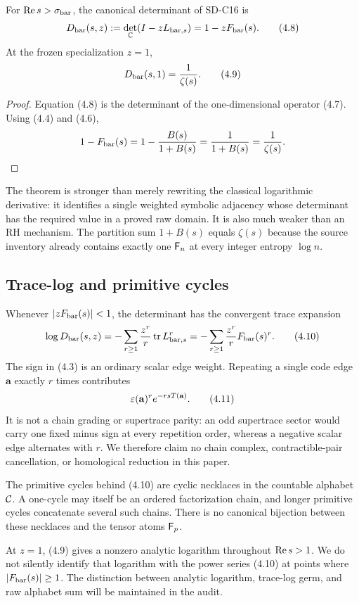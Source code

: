 \begin{theorem}
\label{thm:determinant}
For $\operatorname{Re} s>\sigma_{\rm bar}$, the canonical determinant of SD-C16 is
\[
  D_{\rm bar}(s,z)
  :=\det_{\mathbb C}(I-zL_{\mathrm{bar},s})
  =1-zF_{\rm bar}(s).
  \tag{4.8}
\]
At the frozen specialization $z=1$,
\[
  D_{\rm bar}(s,1)=\frac{1}{\zeta(s)}.
  \tag{4.9}
\]
\end{theorem}

\begin{proof}
Equation (4.8) is the determinant of the one-dimensional operator (4.7).
Using (4.4) and (4.6),
\[
  1-F_{\rm bar}(s)=1-\frac{B(s)}{1+B(s)}
             =\frac1{1+B(s)}=\frac1{\zeta(s)}.
\]
\end{proof}

The theorem is stronger than merely rewriting the classical logarithmic
derivative: it identifies a single weighted symbolic adjacency whose
determinant has the required value in a proved raw domain.  It is also much
weaker than an RH mechanism.  The partition sum $1+B(s)$ equals $\zeta(s)$
because the source inventory already contains exactly one $\mathsf F_n$ at every
integer entropy $\log n$.

\subsection{Trace-log and primitive cycles}

Whenever $|zF_{\rm bar}(s)|<1$, the determinant has the convergent trace expansion
\[
  \log D_{\rm bar}(s,z)
  =-\sum_{r\ge1}\frac{z^r}{r}\operatorname{tr} L_{\mathrm{bar},s}^r
  =-\sum_{r\ge1}\frac{z^r}{r}F_{\rm bar}(s)^r.
  \tag{4.10}
\]
The sign in (4.3) is an ordinary scalar edge weight.  Repeating a single code
edge $\mathbf a$ exactly $r$ times contributes
\[
  \varepsilon(\mathbf a)^r e^{-rsT(\mathbf a)}.
  \tag{4.11}
\]
It is not a chain grading or supertrace parity: an odd supertrace sector would
carry one fixed minus sign at every repetition order, whereas a negative
scalar edge alternates with $r$.  We therefore claim no chain complex,
contractible-pair cancellation, or homological reduction in this paper.

The primitive cycles behind (4.10) are cyclic necklaces in the countable
alphabet $\mathcal C$.  A one-cycle may itself be an ordered factorization chain, and
longer primitive cycles concatenate several such chains.  There is no
canonical bijection between these necklaces and the tensor atoms $\mathsf F_p$.

At $z=1$, (4.9) gives a nonzero analytic logarithm throughout $\operatorname{Re} s>1$.
We do not silently identify that logarithm with the power series (4.10) at
points where $|F_{\rm bar}(s)|\ge1$.  The distinction between analytic logarithm,
trace-log germ, and raw alphabet sum will be maintained in the audit.
